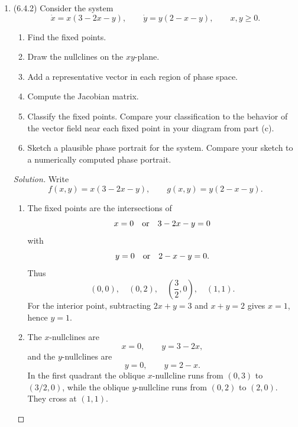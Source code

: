 \documentclass[12pt]{amsart}
\theoremstyle{conjecture}
\theoremstyle{definition}
\theoremstyle{question}
\theoremstyle{theorem}
\newenvironment{solution}
{\begin{proof}[Solution]}
{\end{proof}}
\begin{document}
    \begin{enumerate}[leftmargin=2em]
      \item[(1.)] (6.4.2) Consider the system
      \[
          \dot{x}=x(3-2x-y),
          \qquad
          \dot{y}=y(2-x-y),
          \qquad x,y\geq 0.
      \]
      \begin{enumerate}[label=(\alph*),leftmargin=2.2em]
        \item Find the fixed points.
        \item Draw the nullclines on the $xy$-plane.
        \item Add a representative vector in each region of phase space.
        \item Compute the Jacobian matrix.
        \item Classify the fixed points. Compare your classification to the behavior
        of the vector field near each fixed point in your diagram from part (c).
        \item Sketch a plausible phase portrait for the system. Compare your sketch
        to a numerically computed phase portrait.
      \end{enumerate}

      \begin{solution}
          Write
          \[
              f(x,y)=x(3-2x-y),\qquad g(x,y)=y(2-x-y).
          \]

          \begin{enumerate}[label=(\alph*),leftmargin=2.2em]
        \item The fixed points are the intersections of
        \[
            x=0\quad\hbox{or}\quad 3-2x-y=0
        \]
        with
        \[
            y=0\quad\hbox{or}\quad 2-x-y=0.
        \]
        Thus
        \[
            \boxed{(0,0),\quad(0,2),\quad
            \left(\frac32,0\right),\quad(1,1)}.
        \]
        For the interior point, subtracting
        $2x+y=3$ and $x+y=2$ gives $x=1$, hence $y=1$.

        \item The $x$-nullclines are
        \[
            x=0,\qquad y=3-2x,
        \]
        and the $y$-nullclines are
        \[
            y=0,\qquad y=2-x.
        \]
        In the first quadrant the oblique $x$-nullcline runs from $(0,3)$
        to $(3/2,0)$, while the oblique $y$-nullcline runs from $(0,2)$ to
        $(2,0)$.  They cross at $(1,1)$.


\end{enumerate}
\end{solution}
\end{enumerate}
\end{document}
